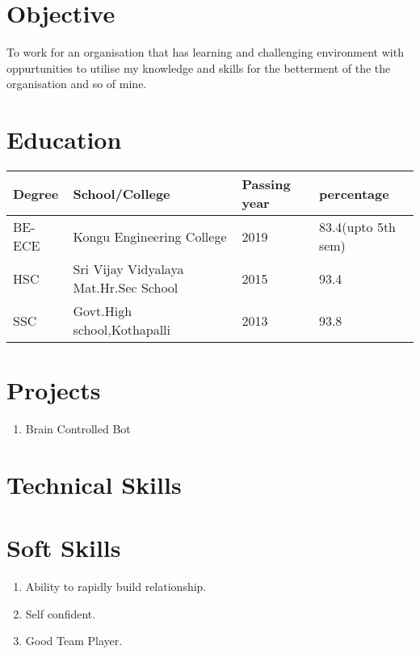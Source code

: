 \documentclass[11pt,a4paper,sans]{moderncv}        %
\begin{document}
\makecvtitle
\section{Objective}
\makeatletter
To work for an organisation that has learning and challenging environment with oppurtunities to utilise my knowledge and skills for the betterment of the the organisation and so of mine.

\section{Education}
\begin{tabular}{ | l | l | l | l |}
    \hline
     Degree & School/College & Passing year & percentage\\
     \hline
     BE-ECE & Kongu Engineering College & 2019 & 83.4(upto 5th sem)\\
     \hline
     HSC & Sri Vijay Vidyalaya Mat.Hr.Sec School & 2015 & 93.4\\
     \hline
     SSC & Govt.High school,Kothapalli & 2013 & 93.8\\
     \hline
     
\end{tabular}


\section{Projects}
\begin{enumerate}
    \setlength\itemindent{5cm}\item Brain Controlled Bot
\end{enumerate}

\section{Technical Skills}

\section{Soft Skills}
\begin{enumerate}
   \setlength\itemindent{5cm}\item Ability to rapidly build relationship.
    \setlength\itemindent{5cm}\item Self confident.
   \setlength\itemindent{5cm}\item Good Team Player.
\end{enumerate}
\end{document}
